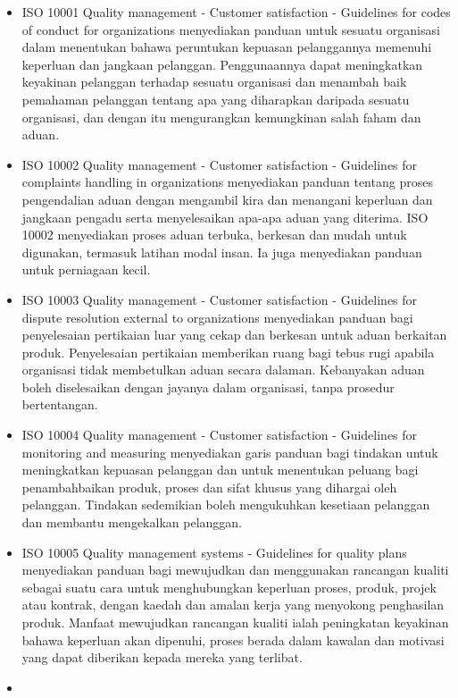 \documentclass[
]{article}
\begin{document}
\begin{itemize}
\item
  ISO 10001 Quality management - Customer satisfaction - Guidelines for
  codes of conduct for organizations menyediakan panduan untuk sesuatu
  organisasi dalam menentukan bahawa peruntukan kepuasan pelanggannya
  memenuhi keperluan dan jangkaan pelanggan. Penggunaannya dapat
  meningkatkan keyakinan pelanggan terhadap sesuatu organisasi dan
  menambah baik pemahaman pelanggan tentang apa yang diharapkan daripada
  sesuatu organisasi, dan dengan itu mengurangkan kemungkinan salah
  faham dan aduan.
\item
  ISO 10002 Quality management - Customer satisfaction - Guidelines for
  complaints handling in organizations menyediakan panduan tentang
  proses pengendalian aduan dengan mengambil kira dan menangani
  keperluan dan jangkaan pengadu serta menyelesaikan apa-apa aduan yang
  diterima. ISO 10002 menyediakan proses aduan terbuka, berkesan dan
  mudah untuk digunakan, termasuk latihan modal insan. Ia juga
  menyediakan panduan untuk perniagaan kecil.
\item
  ISO 10003 Quality management - Customer satisfaction - Guidelines for
  dispute resolution external to organizations menyediakan panduan bagi
  penyelesaian pertikaian luar yang cekap dan berkesan untuk aduan
  berkaitan produk. Penyelesaian pertikaian memberikan ruang bagi tebus
  rugi apabila organisasi tidak membetulkan aduan secara dalaman.
  Kebanyakan aduan boleh diselesaikan dengan jayanya dalam organisasi,
  tanpa prosedur bertentangan.
\item
  ISO 10004 Quality management - Customer satisfaction - Guidelines for
  monitoring and measuring menyediakan garis panduan bagi tindakan untuk
  meningkatkan kepuasan pelanggan dan untuk menentukan peluang bagi
  penambahbaikan produk, proses dan sifat khusus yang dihargai oleh
  pelanggan. Tindakan sedemikian boleh mengukuhkan kesetiaan pelanggan
  dan membantu mengekalkan pelanggan.
\item
  ISO 10005 Quality management systems - Guidelines for quality plans
  menyediakan panduan bagi mewujudkan dan menggunakan rancangan kualiti
  sebagai suatu cara untuk menghubungkan keperluan proses, produk,
  projek atau kontrak, dengan kaedah dan amalan kerja yang menyokong
  penghasilan produk. Manfaat mewujudkan rancangan kualiti ialah
  peningkatan keyakinan bahawa keperluan akan dipenuhi, proses berada
  dalam kawalan dan motivasi yang dapat diberikan kepada mereka yang
  terlibat.
\item

\end{itemize}
\end{document}

